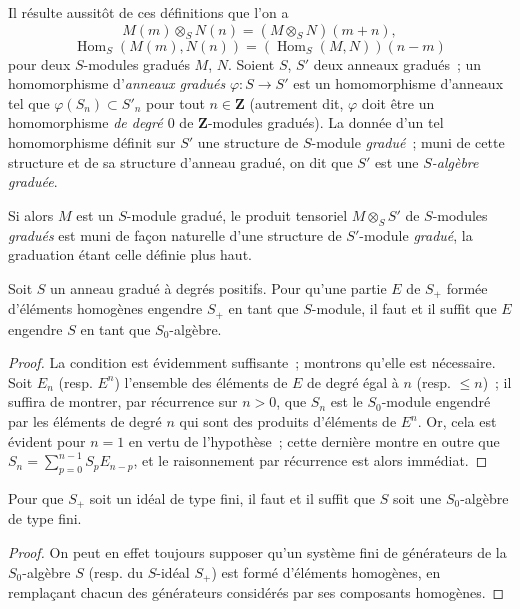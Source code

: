 \begin{env}[2.1.2]
Il résulte aussitôt de ces définitions que l'on a
\[
  \label{II.2.1.2.1-fr}
  M(m)\otimes_S N(n)=(M\otimes_S N)(m+n),
  \tag{2.1.2.1}
\]
\[
  \label{II.2.1.2.2-fr}
  \operatorname{Hom}_S(M(m),N(n))
  =(\operatorname{Hom}_S(M,N))(n-m)
  \tag{2.1.2.2}
\]
pour deux $S$-modules gradués $M$, $N$.
Soient $S$, $S'$ deux anneaux gradués~; un homomorphisme d'\emph{anneaux
gradués} $\varphi:S\to S'$ est un homomorphisme d'anneaux tel que
$\varphi(S_n)\subset S'_n$ pour tout $n\in\mathbf{Z}$ (autrement dit,
$\varphi$ doit être un homomorphisme \emph{de degré $0$} de
$\mathbf{Z}$-modules gradués). La donnée d'un tel homomorphisme définit sur
$S'$ une structure de $S$-module \emph{gradué}~; muni de cette structure et
de sa structure d'anneau gradué, on dit que $S'$ est une \emph{$S$-algèbre
graduée}.

Si alors $M$ est un $S$-module gradué, le produit tensoriel $M\otimes_S S'$
de $S$-modules \emph{gradués} est muni de façon naturelle d'une structure de
$S'$-module \emph{gradué}, la graduation étant celle définie plus haut.
\end{env}

\begin{lemma}[2.1.3]
\label{II.2.1.3-fr}
Soit $S$ un anneau gradué à degrés positifs. Pour qu'une partie $E$ de $S_+$
formée d'éléments homogènes engendre $S_+$ en tant que $S$-module, il faut et
il suffit que $E$ engendre $S$ en tant que $S_0$-algèbre.
\end{lemma}

\begin{proof}
La condition est évidemment suffisante~; montrons qu'elle est nécessaire.
Soit $E_n$ (resp. $E^n$) l'ensemble des éléments de $E$ de degré égal à $n$
(resp. $\leq n$)~; il suffira de montrer, par récurrence sur $n>0$, que $S_n$
est le $S_0$-module engendré par les éléments de degré $n$ qui sont des
produits d'éléments de $E^n$. Or, cela est évident pour $n=1$ en vertu de
l'hypothèse~; cette dernière montre en outre que
$S_n=\sum_{p=0}^{n-1}S_pE_{n-p}$, et le raisonnement par récurrence est alors
immédiat.
\end{proof}

\begin{corollary}[2.1.4]
\label{II.2.1.4-fr}
Pour que $S_+$ soit un idéal de type fini, il faut et il suffit que $S$ soit
une $S_0$-algèbre de type fini.
\end{corollary}

\begin{proof}
On peut en effet toujours supposer qu'un système fini de générateurs de la
$S_0$-algèbre $S$ (resp. du $S$-idéal $S_+$) est formé d'éléments homogènes,
en remplaçant chacun des générateurs considérés par ses composants homogènes.
\end{proof}

